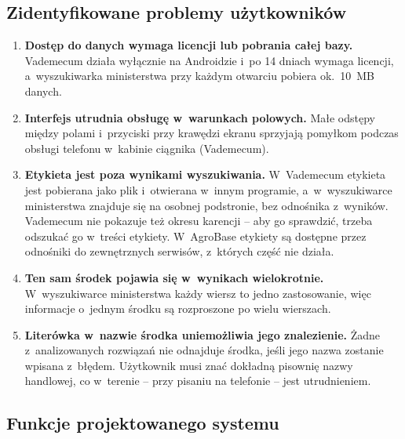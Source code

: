 \subsection{Zidentyfikowane problemy użytkowników}

\begin{enumerate}
    \item \textbf{Dostęp do danych wymaga licencji lub pobrania całej bazy.}
    Vademecum działa wyłącznie na Androidzie i~po 14 dniach wymaga licencji,
    a~wyszukiwarka ministerstwa przy każdym otwarciu pobiera ok.~10~MB danych.

    \item \textbf{Interfejs utrudnia obsługę w~warunkach polowych.}
    Małe odstępy między polami i~przyciski przy krawędzi ekranu sprzyjają
    pomyłkom podczas obsługi telefonu w~kabinie ciągnika (Vademecum).

    \item \textbf{Etykieta jest poza wynikami wyszukiwania.}
    W~Vademecum etykieta jest pobierana jako plik i~otwierana w~innym
    programie, a~w~wyszukiwarce ministerstwa znajduje się na osobnej
    podstronie, bez odnośnika z~wyników. Vademecum nie pokazuje też okresu
    karencji -- aby go sprawdzić, trzeba odszukać go w~treści etykiety.
    W~AgroBase etykiety są dostępne przez odnośniki do zewnętrznych
    serwisów, z~których część nie działa.

    \item \textbf{Ten sam środek pojawia się w~wynikach wielokrotnie.}
    W~wyszukiwarce ministerstwa każdy wiersz to jedno zastosowanie, więc
    informacje o~jednym środku są rozproszone po wielu wierszach.

    \item \textbf{Literówka w~nazwie środka uniemożliwia jego znalezienie.}
    Żadne z~analizowanych rozwiązań nie odnajduje środka, jeśli jego nazwa
    zostanie wpisana z~błędem. Użytkownik musi znać dokładną pisownię nazwy
    handlowej, co w~terenie -- przy pisaniu na telefonie -- jest
    utrudnieniem.
\end{enumerate}

\subsection{Funkcje projektowanego systemu}

